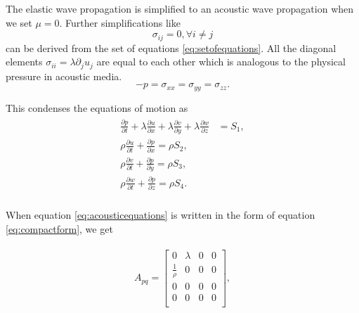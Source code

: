 The elastic wave propagation is simplified to an acoustic wave propagation when we set $\mu = 0$. Further simplifications like
\begin{equation}
    \sigma_{ij} = 0, \forall i \neq j
\end{equation}
can be derived from the set of equations \ref{eq:setofequations}. All the diagonal elements $\sigma_{ii} = \lambda \partial_j u_j$
are equal to each other which is analogous to the physical pressure in acoustic media. 
\begin{equation}
    -p = \sigma_{xx} = \sigma_{yy} = \sigma_{zz} .
\end{equation}


This condenses the equations of motion as
\begin{align}
    \begin{split}
        \frac{\partial p}{\partial t} + \lambda \frac{\partial u}{\partial x} + \lambda \frac{\partial v}{\partial y} + \lambda \frac{\partial w}{\partial z} &= S_1, \\
        \rho \frac{\partial u}{\partial t} + \frac{\partial p}{\partial x} = \rho S_2, \\
        \rho \frac{\partial v}{\partial t} + \frac{\partial p}{\partial y} = \rho S_3, \\
        \rho \frac{\partial w}{\partial t} + \frac{\partial p}{\partial z} = \rho S_4. \\
    \end{split}
    \label{eq:acousticequations}
\end{align}

When equation \ref{eq:acousticequations} is written in the form of equation \ref{eq:compactform}, we get 

\begin{align}
    \begin{split}
    A_{pq} = 
        \begin{bmatrix}
            0 & \lambda & 0 & 0 \\
            \frac{1}{\rho} & 0 & 0 & 0 \\
            0 & 0 & 0 & 0 \\
            0 & 0 & 0 & 0 \\
    \end{bmatrix},
    \end{split}
\end{align}

